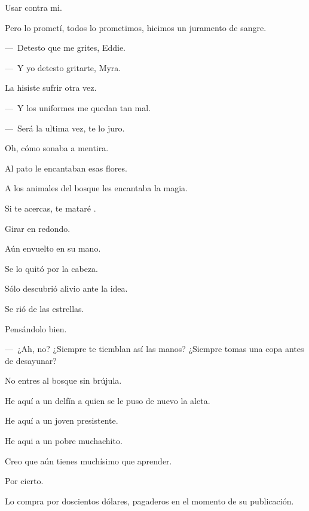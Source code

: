 \sk
Usar contra mi. \nb{}

\sk
Pero lo prometí, todos lo prometimos, hicimos un juramento de sangre. 

\sk
---~Detesto que me grites, Eddie.\nb{}

---~Y yo detesto gritarte, Myra.\nb{}

\sk
La hisiste sufrir otra vez. 

\sk
---~Y los uniformes me quedan tan mal.\nb{}

---~Será la ultima vez, te lo juro.\nb{}

\sk
Oh, cómo sonaba a mentira. 

\sk
Al pato le encantaban esas flores.\nb{}

\sk
A los animales del bosque les encantaba la magia.\nb{}

\sk
Si te acercas, te mataré .\nb{}

\sk
Girar en redondo. 

\sk
Aún envuelto en su mano. 

\sk
Se lo quitó por la cabeza. 

\sk
Sólo descubrió alivio ante la idea. 

\sk
Se rió de las estrellas. 

\sk
Pensándolo bien. 

\sk
---~¿Ah, no? ¿Siempre te tiemblan así las manos? ¿Siempre tomas una copa antes de desayunar?\nb{}

\sk
No entres al bosque sin brújula. 

\sk
He aquí a un delfín a quien se le puso de nuevo la aleta. 

\sk
He aquí a un joven presistente. 

\sk
He aqui a un pobre muchachito. 

\sk
Creo que aún tienes muchísimo que aprender. 

\sk
Por cierto. 

\sk
Lo compra por doscientos dólares, pagaderos en el momento de su publica\-ción. 

